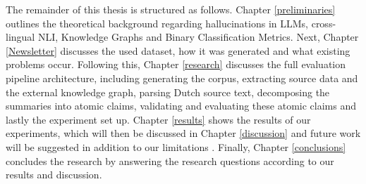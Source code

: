 The remainder of this thesis is structured as follows. Chapter \ref{preliminaries} outlines the theoretical background regarding hallucinations in LLMs, cross-lingual NLI, Knowledge Graphs and Binary Classification Metrics. Next, Chapter \ref{Newsletter} discusses the used dataset, how it was generated and what existing problems occur. Following this, Chapter \ref{research} discusses the full evaluation pipeline architecture, including generating the corpus, extracting source data and the external knowledge graph, parsing Dutch source text, decomposing the summaries into atomic claims, validating and evaluating these atomic claims and lastly the experiment set up. Chapter \ref{results} shows the results of our experiments, which will then be discussed in Chapter \ref{discussion} and future work will be suggested in addition to our limitations . Finally, Chapter \ref{conclusions} concludes the research by answering the research questions according to our results and discussion.




